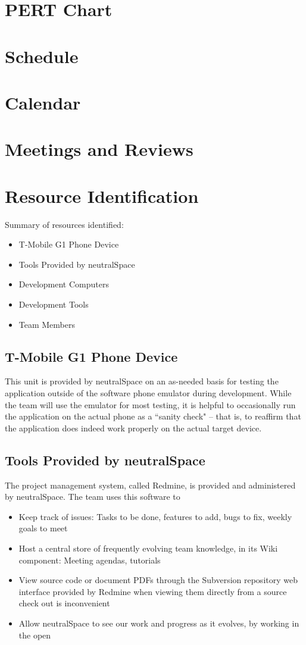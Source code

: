 \documentclass[11pt]{article}
\begin{document}
\section{PERT Chart}
\section{Schedule}
\section{Calendar}
\section{Meetings and Reviews}
\section{Resource Identification}
	Summary of resources identified:
	\begin{itemize}
		\item{T-Mobile G1 Phone Device}
		\item{Tools Provided by neutralSpace}
		\item{Development Computers}
		\item{Development Tools}
		\item{Team Members}
	\end{itemize}

	\subsection{T-Mobile G1 Phone Device}
		This unit is provided by neutralSpace on an as-needed basis for testing the application outside of the software phone emulator during development. While the team will use the emulator for most testing, it is helpful to occasionally run the application on the actual phone as a ``sanity check" -- that is, to reaffirm that the application does indeed work properly on the actual target device.

	\subsection{Tools Provided by neutralSpace}
		The project management system, called Redmine, is provided and administered by neutralSpace. The team uses this software to
		\begin{itemize}
			\item{Keep track of issues: Tasks to be done, features to add, bugs to fix, weekly goals to meet}
			\item{Host a central store of frequently evolving team knowledge, in its Wiki component: Meeting agendas, tutorials}
			\item{View source code or document PDFs through the Subversion repository web interface provided by Redmine when viewing them directly from a source check out is inconvenient}
			\item{Allow neutralSpace to see our work and progress as it evolves, by working in the open}
		\end{itemize}
\end{document}
